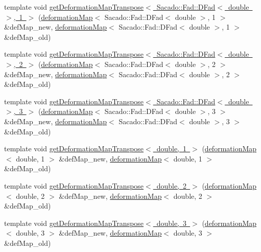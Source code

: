 \begin{DoxyCompactItemize}
\item 
template void \mbox{\hyperlink{function_evaluations_8cc_a57b94bf3e5309492433be576f3e57c03}{get\+Deformation\+Map\+Transpose$<$ Sacado\+::\+Fad\+::\+D\+Fad$<$ double $>$, 1 $>$}} (\mbox{\hyperlink{structdeformation_map}{deformation\+Map}}$<$ Sacado\+::\+Fad\+::\+D\+Fad$<$ double $>$, 1 $>$ \&def\+Map\+\_\+new, \mbox{\hyperlink{structdeformation_map}{deformation\+Map}}$<$ Sacado\+::\+Fad\+::\+D\+Fad$<$ double $>$, 1 $>$ \&def\+Map\+\_\+old)
\item 
template void \mbox{\hyperlink{function_evaluations_8cc_a4ddf5fdc58a19c93899099e38e4a2125}{get\+Deformation\+Map\+Transpose$<$ Sacado\+::\+Fad\+::\+D\+Fad$<$ double $>$, 2 $>$}} (\mbox{\hyperlink{structdeformation_map}{deformation\+Map}}$<$ Sacado\+::\+Fad\+::\+D\+Fad$<$ double $>$, 2 $>$ \&def\+Map\+\_\+new, \mbox{\hyperlink{structdeformation_map}{deformation\+Map}}$<$ Sacado\+::\+Fad\+::\+D\+Fad$<$ double $>$, 2 $>$ \&def\+Map\+\_\+old)
\item 
template void \mbox{\hyperlink{function_evaluations_8cc_afa134cc0a430399a7c20d2d82dd652bb}{get\+Deformation\+Map\+Transpose$<$ Sacado\+::\+Fad\+::\+D\+Fad$<$ double $>$, 3 $>$}} (\mbox{\hyperlink{structdeformation_map}{deformation\+Map}}$<$ Sacado\+::\+Fad\+::\+D\+Fad$<$ double $>$, 3 $>$ \&def\+Map\+\_\+new, \mbox{\hyperlink{structdeformation_map}{deformation\+Map}}$<$ Sacado\+::\+Fad\+::\+D\+Fad$<$ double $>$, 3 $>$ \&def\+Map\+\_\+old)
\item 
template void \mbox{\hyperlink{function_evaluations_8cc_a7e7354d28657df00b72c866eccede24a}{get\+Deformation\+Map\+Transpose$<$ double, 1 $>$}} (\mbox{\hyperlink{structdeformation_map}{deformation\+Map}}$<$ double, 1 $>$ \&def\+Map\+\_\+new, \mbox{\hyperlink{structdeformation_map}{deformation\+Map}}$<$ double, 1 $>$ \&def\+Map\+\_\+old)
\item 
template void \mbox{\hyperlink{function_evaluations_8cc_a06a40fe8ccce6ea8a8005e65e4495a90}{get\+Deformation\+Map\+Transpose$<$ double, 2 $>$}} (\mbox{\hyperlink{structdeformation_map}{deformation\+Map}}$<$ double, 2 $>$ \&def\+Map\+\_\+new, \mbox{\hyperlink{structdeformation_map}{deformation\+Map}}$<$ double, 2 $>$ \&def\+Map\+\_\+old)
\item 
template void \mbox{\hyperlink{function_evaluations_8cc_a867f90eaceee3244d8e5fd5692fe0117}{get\+Deformation\+Map\+Transpose$<$ double, 3 $>$}} (\mbox{\hyperlink{structdeformation_map}{deformation\+Map}}$<$ double, 3 $>$ \&def\+Map\+\_\+new, \mbox{\hyperlink{structdeformation_map}{deformation\+Map}}$<$ double, 3 $>$ \&def\+Map\+\_\+old)

\end{DoxyCompactItemize}
